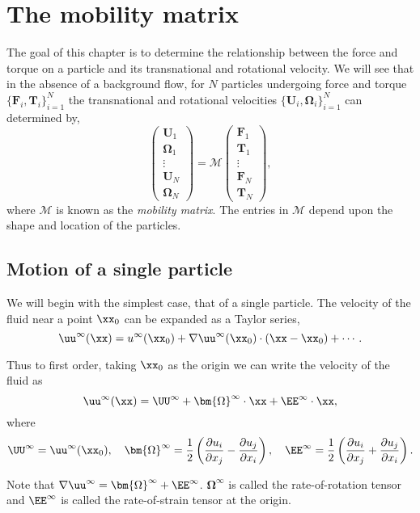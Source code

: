 \chapter{The mobility matrix}

The goal of this chapter is to determine the relationship between the force and torque on a particle and its transnational and rotational velocity. We will see that in the absence of a background flow, for $N$ particles undergoing force and torque $\{\mathbf{F}_i, \mathbf{T}_i\}_{i=1}^N$ the transnational and rotational velocities $\{\mathbf{U}_i, \bm{\Omega}_i\}_{i=1}^N$ can determined by,
\[ \begin{pmatrix} \mathbf{U}_1 \\ \bm{\Omega}_1 \\ \vdots \\ \mathbf{U}_N \\ \bm{\Omega}_N\end{pmatrix} = \mathcal{M} \begin{pmatrix} \mathbf{F}_1 \\ \mathbf{T}_1 \\ \vdots \\ \mathbf{F}_N \\ \mathbf{T}_N\end{pmatrix},\]
where $\mathcal{M}$ is known as the \emph{mobility matrix}. The entries in $\mathcal{M}$ depend upon the shape and location of the particles. 

\section{Motion of a single particle}

We will begin with the simplest case, that of a single particle. The velocity of the fluid near a point $\xx_0$ can be expanded as a Taylor series,
\[ \uu^\infty(\xx) = u^\infty(\xx_0) + \nabla \uu^\infty(\xx_0)\cdot(\xx - \xx_0) + \cdots.\]

Thus to first order, taking $\xx_0$ as the origin we can write the velocity of the fluid as 
\[ \uu^\infty(\xx) = \UU^{\infty} + \bm{\Omega}^\infty\cdot\xx + \EE^\infty\cdot\xx,\]
where 
\[ \UU^\infty = \uu^\infty(\xx_0), \quad \bm{\Omega}^\infty = \frac{1}{2}\left(\frac{\partial u_i}{\partial x_j} - \frac{\partial u_j}{\partial x_i}\right), \quad \EE^\infty = \frac{1}{2}\left(\frac{\partial u_i}{\partial x_j} + \frac{\partial u_j}{\partial x_i}\right).\]

Note that $\nabla\uu^{\infty} = \bm{\Omega}^{\infty} + \EE^\infty$. $\bm{\Omega}^\infty$ is called the rate-of-rotation tensor and $\EE^\infty$ is called the rate-of-strain tensor at the origin.

